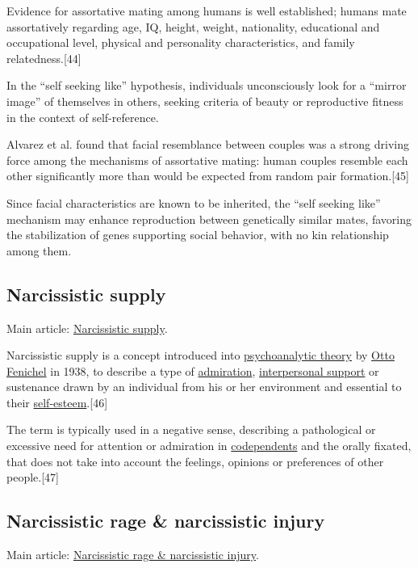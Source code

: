 \documentclass[oneside]{book}
\numberwithin{equation}{section}
\begin{document}
Evidence for assortative mating among humans is well established; humans mate assortatively regarding age, IQ, height, weight, nationality, educational and occupational level, physical and personality characteristics, and family relatedness.[44]

In the ``self seeking like'' hypothesis, individuals unconsciously look for a ``mirror image'' of themselves in others, seeking criteria of beauty or reproductive fitness in the context of self-reference.

Alvarez et al. found that facial resemblance between couples was a strong driving force among the mechanisms of assortative mating: human couples resemble each other significantly more than would be expected from random pair formation.[45]

Since facial characteristics are known to be inherited, the ``self seeking like'' mechanism may enhance reproduction between genetically similar mates, favoring the stabilization of genes supporting social behavior, with no kin relationship among them.

\subsection{Narcissistic supply}
Main article: \href{https://en.wikipedia.org/wiki/Narcissistic_supply}{Narcissistic supply}.

Narcissistic supply is a concept introduced into \href{https://en.wikipedia.org/wiki/Psychoanalysis#Theories}{psychoanalytic theory} by \href{https://en.wikipedia.org/wiki/Otto_Fenichel}{Otto Fenichel} in 1938, to describe a type of \href{https://en.wikipedia.org/wiki/Admiration}{admiration}, \href{https://en.wikipedia.org/wiki/Social_support}{interpersonal support} or sustenance drawn by an individual from his or her environment and essential to their \href{https://en.wikipedia.org/wiki/Self-esteem}{self-esteem}.[46]

The term is typically used in a negative sense, describing a pathological or excessive need for attention or admiration in \href{https://en.wikipedia.org/wiki/Codependents}{codependents} and the orally fixated, that does not take into account the feelings, opinions or preferences of other people.[47]

\subsection{Narcissistic rage \& narcissistic injury}
Main article: \href{https://en.wikipedia.org/wiki/Narcissistic_rage_and_narcissistic_injury}{Narcissistic rage \& narcissistic injury}.
\end{document}
